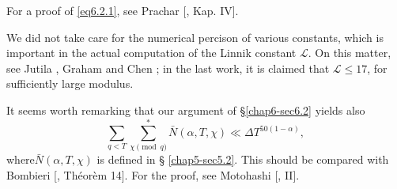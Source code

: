 For a proof of \eqref{eq6.2.1}, see Prachar [\cite{key62}, Kap. IV].

We did not take care for the numerical percison of various constants,
which is important in the actual computation of the Linnik constant
$\mathscr{L}$. On this matter, see Jutila \cite{key40}, Graham
\cite{key19} and Chen \cite{key11}; in the last work, it is claimed
that $\mathscr{L} \le 17$, for sufficiently large modulus. 

It seems worth remarking that our argument of \S \ref{chap6-sec6.2}
yields also 
{\fontsize{10pt}{12pt}\selectfont
$$
\sum_{q < T} \sum^*_{\chi \pmod{q}} \bar{N} (\alpha, T, \chi) \ll \Delta
T^{50(1-\alpha)}, 
$$}\relax
where\pageoriginale$\bar{N}(\alpha, T, \chi)$ is defined in \S
\ref{chap5-sec5.2}. This should be 
compared with Bom\-bieri [\cite{key6}, Th\'eor\`em 14]. For the proof, see
Motohashi [\cite{key55}, II].

